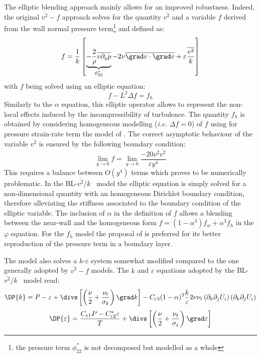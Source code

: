 The elliptic blending approach mainly allows for an improved robustness. 
Indeed, the original $\overline{v^2}-f$ approach solves for the quantity 
$\overline{v^2}$ and a variable $f$ derived from the wall normal 
pressure term\footnote{the pressure term $\phi_{22}^*$ is not decomposed but modelled as a whole}
 and defined as:
%
\begin{equation}
	f= \dfrac{1}{k} \left[ \underbrace{-\dfrac{2}{\rho}\overline{v \partial_y p}}_{\phi_{22}^*}-2 \nu\overline{\grad v \cdot \grad v}+\varepsilon \dfrac{\overline{v^2}}{k} \right] 
\end{equation}
%
with $f$ being solved using an elliptic equation:
%
\begin{equation}
	f-L^2 \Delta f = f_h
\end{equation}
%
Similarly to the $\alpha$ equation, this elliptic operator allows
 to represent the non-local effects induced by the
 incompressibility of turbulence. The quantity $f_h$ is obtained by
 considering homogeneous modelling (\emph{i.e.} $\Delta f=0$) of $f$ using 
for pressure strain-rate term the model of \cite{Launder:1975}. The correct
 asymptotic behaviour of the variable $\overline{v^2}$ is ensured
 by the following boundary condition:
%
\begin{equation}
   \lim_{y\to 0} f = \lim_{y\to 0} \dfrac{-20 \nu^2 \overline{v^2}}{ \varepsilon y^4}
   \label{eq:turbul:blv2kbc_f_durbin}
\end{equation}
%
This requires a balance between $O(y^4)$ terms which proves to be numerically problematic.
 In the \mbox{BL-$\overline{v^2}/k$~} model the elliptic equation is simply solved
 for a non-dimensional quantity with an homogeneous Dirichlet boundary condition, 
therefore alleviating the stiffness associated to the boundary condition of the 
elliptic variable. The inclusion of $\alpha$ in the definition of $f$ allows a blending 
between the near-wall and the homogeneous form $f=(1-\alpha^3) f_w+\alpha^3 f_h$ in the 
$\varphi$ equation. For the $f_h$ model the proposal of \cite{Speziale:1991} is preferred 
for its better reproduction of the pressure term in a boundary layer. 

The model also solves a $k$-$\varepsilon$ system somewhat modified compared to the one 
generally adopted by $\overline{v^2}-f$ models. The $k$ and $\varepsilon$ equations 
adopted by the BL-$\overline{v^2}/k$~ model read:
%
\begin{equation} \label{eq:turbul:blv2kk}
   \DP{ k} = P -  \varepsilon 
           + \divs \left[ \left( \frac{\nu}{2}  + \frac{\nu_t}{\sigma_k}  \right) \grad k \right] 
    - C_{\varepsilon 3} (1-\alpha)^3 \frac{k}{\varepsilon} 2 \nu  \nu_t \left( \partial_k \partial_j U_i \right)\left( \partial_k \partial_j  U_i \right)
 \end{equation}
\begin{equation}  \label{eq:turbul:blv2kep}
	\DP{\varepsilon} = \frac{C_{\varepsilon 1} P - C_{\varepsilon 2}^* \varepsilon }{T} 
          + \divs \left[ \left( \frac{\nu}{2}  + \frac{\nu_t}{\sigma_{\varepsilon}}  \right) \grad \varepsilon \right]  
\end{equation}

